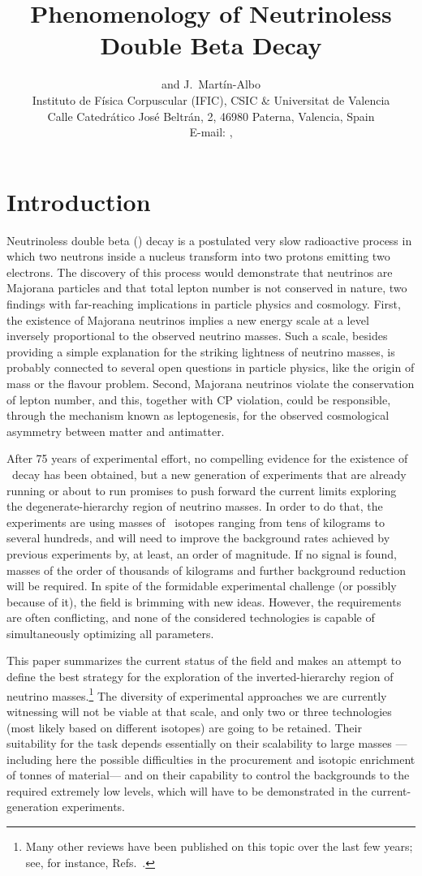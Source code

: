 \documentclass{PoS}
\title{Phenomenology of Neutrinoless Double Beta Decay}
\author{\speaker{J.J.\ G\'omez-Cadenas} and J.\ Mart\'in-Albo\\
Instituto de F\'isica Corpuscular (IFIC), CSIC \& Universitat de Valencia\\
Calle Catedr\'atico Jos\'e Beltr\'an, 2, 46980 Paterna, Valencia, Spain\\
E-mail: \email{gomez@mail.cern.ch}, \email{jmalbos@ific.uv.es}}
\begin{document}
\section{Introduction}
Neutrinoless double beta (\bbonu) decay is a postulated very slow radioactive process in which two neutrons inside a nucleus transform into two protons emitting two electrons. The discovery of this process would demonstrate that neutrinos are Majorana particles and that total lepton number is not conserved in nature, two findings with far-reaching implications in particle physics and cosmology. First, the existence of Majorana neutrinos implies a new energy scale at a level inversely proportional to the observed neutrino masses. Such a scale, besides providing a simple explanation for the striking lightness of neutrino masses, is probably connected to several open questions in particle physics, like the origin of mass or the flavour problem. Second, Majorana neutrinos violate the conservation of lepton number, and this, together with CP violation, could be responsible, through the mechanism known as leptogenesis, for the observed cosmological asymmetry between matter and antimatter. 

After 75 years of experimental effort, no compelling evidence for the existence of \bbonu\ decay has been obtained, but a new generation of experiments that are already running or about to run promises to push forward the current limits exploring the degenerate-hierarchy region of neutrino masses. In order to do that, the experiments are using masses of \bbonu\ isotopes ranging from tens of kilograms to several hundreds, and will need to improve the background rates achieved by previous experiments by, at least, an order of magnitude. If no signal is found, masses of the order of thousands of kilograms and further background reduction will be required. In spite of the formidable experimental challenge (or possibly because of it), the field is brimming with new ideas. However, the requirements are often conflicting, and none of the considered technologies is capable of simultaneously optimizing all parameters. 

This paper summarizes the current status of the field and makes an attempt to define the best strategy for the exploration of the inverted-hierarchy region of neutrino masses.\footnote{Many other reviews have been published on this topic over the last few years; see, for instance, Refs.~\cite{GomezCadenas:2011it, Elliott:2012sp, Giuliani:2012zu, Cremonesi:2013vla, Bilenky:2014uka}.} The diversity of experimental approaches we are currently witnessing will not be viable at that scale, and only two or three technologies (most likely based on different isotopes) are going to be retained. Their suitability for the task depends essentially on their scalability to large masses ---\thinspace including here the possible difficulties in the procurement and isotopic enrichment of tonnes of material\thinspace--- and on their capability to control the backgrounds to the required extremely low levels, which will have to be demonstrated in the current-generation experiments.
\end{document}
